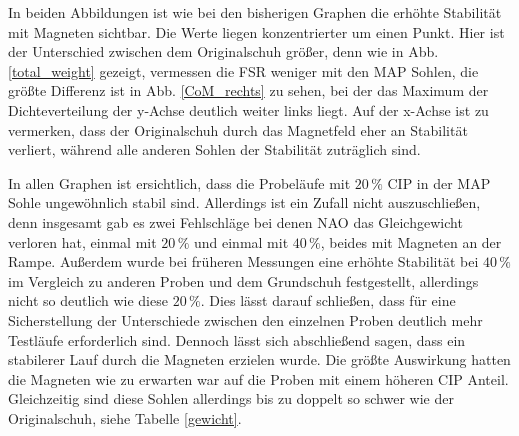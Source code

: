 In beiden Abbildungen ist wie bei den bisherigen Graphen die erhöhte Stabilität mit Magneten sichtbar. Die Werte liegen konzentrierter um einen Punkt. Hier ist der Unterschied zwischen dem Originalschuh größer, denn wie in Abb. \ref{total_weight} gezeigt, vermessen die FSR weniger mit den MAP Sohlen, die größte Differenz ist in Abb. \ref{CoM_rechts} zu sehen, bei der das Maximum der Dichteverteilung der y-Achse deutlich weiter links liegt. Auf der x-Achse ist zu vermerken, dass der Originalschuh durch das Magnetfeld eher an Stabilität verliert, während alle anderen Sohlen der Stabilität zuträglich sind.  

In allen Graphen ist ersichtlich, dass die Probeläufe mit $20\,\%$ CIP in der MAP Sohle ungewöhnlich stabil sind. Allerdings ist ein Zufall nicht auszuschließen, denn insgesamt gab es zwei Fehlschläge bei denen NAO das Gleichgewicht verloren hat, einmal mit $20\,\%$ und einmal mit $40\,\%$, beides mit Magneten an der Rampe. Außerdem wurde bei früheren Messungen eine erhöhte Stabilität bei $40\,\%$ im Vergleich zu anderen Proben und dem Grundschuh festgestellt, allerdings nicht so deutlich wie diese $20\,\%$. Dies lässt darauf schließen, dass für eine Sicherstellung der Unterschiede zwischen den einzelnen Proben deutlich mehr Testläufe erforderlich sind. Dennoch lässt sich abschließend sagen, dass ein stabilerer Lauf durch die Magneten erzielen wurde. Die größte Auswirkung hatten die Magneten wie zu erwarten war auf die Proben mit einem höheren CIP Anteil. Gleichzeitig sind diese Sohlen allerdings bis zu doppelt so schwer wie der Originalschuh, siehe Tabelle \ref{gewicht}. 







